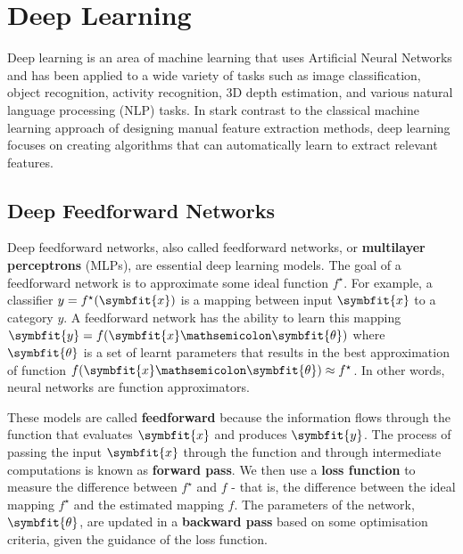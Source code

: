 \chapter{Deep Learning} \label{chap:basics-of-dl}

Deep learning is an area of machine learning that uses Artificial Neural Networks \parencite{mcculloch1943logical} and has been applied to a wide variety of tasks such as image classification, object recognition, activity recognition, 3D depth estimation, and various natural language processing (NLP) tasks. In stark contrast to the classical machine learning approach of designing manual feature extraction methods, deep learning focuses on creating algorithms that can automatically learn to extract relevant features.

\section{Deep Feedforward Networks} \label{sec:feed-forward-nets}

Deep feedforward networks, also called feedforward networks, or \textbf{multilayer perceptrons} (MLPs), are essential deep learning models. The goal of a feedforward network is to approximate some ideal function \(f^\star\). 
For example, a classifier \(y = f^\star(\symbfit{x})\) is a mapping between input $\symbfit{x}$ to a category $y$. A feedforward network has the ability to learn this mapping \(\symbfit{y} = f(\symbfit{x} \mathsemicolon \symbfit{\theta})\) where $\symbfit{\theta}$ is a set of learnt parameters that results in the best approximation of function $f(\symbfit{x} \mathsemicolon \symbfit{\theta}) \approx f^\star$. In other words, neural networks are function approximators.

These models are called \textbf{feedforward} because the information flows through the function that evaluates $\symbfit{x}$ and produces $\symbfit{y}$. The process of passing the input $\symbfit{x}$ through the function and through intermediate computations is known as \textbf{forward pass}.
We then use a \textbf{loss function} to measure the difference between $f^\star$ and $f$ - that is, the difference between the ideal mapping $f^\star$ and the estimated mapping $f$. 
The parameters of the network, $\symbfit{\theta}$, are updated in a \textbf{backward pass} based on some optimisation criteria, given the guidance of the loss function. 

